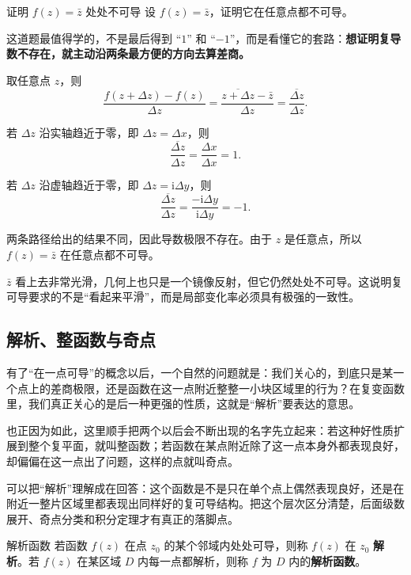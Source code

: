 \begin{lizi}{证明 $f(z)=\bar z$ 处处不可导}{}
设 $f(z)=\bar z$，证明它在任意点都不可导。

\begin{jie}
这道题最值得学的，不是最后得到 ``$1$'' 和 ``$-1$''，而是看懂它的套路：\textbf{想证明复导数不存在，就主动沿两条最方便的方向去算差商。}

取任意点 $z$，则
\[
    \frac{f(z+\Delta z)-f(z)}{\Delta z}
    =\frac{\overline{z+\Delta z}-\bar z}{\Delta z}
    =\frac{\overline{\Delta z}}{\Delta z}.
\]

若 $\Delta z$ 沿实轴趋近于零，即 $\Delta z=\Delta x$，则
\[
    \frac{\overline{\Delta z}}{\Delta z}
    =\frac{\Delta x}{\Delta x}=1.
\]

若 $\Delta z$ 沿虚轴趋近于零，即 $\Delta z=\mathrm{i}\Delta y$，则
\[
    \frac{\overline{\Delta z}}{\Delta z}
    =\frac{-\mathrm{i}\Delta y}{\mathrm{i}\Delta y}=-1.
\]

两条路径给出的结果不同，因此导数极限不存在。由于 $z$ 是任意点，所以 $f(z)=\bar z$ 在任意点都不可导。
\end{jie}
\end{lizi}

\begin{tishi}[这个反例为什么重要]
$\bar z$ 看上去非常光滑，几何上也只是一个镜像反射，但它仍然处处不可导。这说明复可导要求的不是``看起来平滑''，而是局部变化率必须具有极强的一致性。
\end{tishi}

\subsection{解析、整函数与奇点}

有了``在一点可导''的概念以后，一个自然的问题就是：我们关心的，到底只是某一个点上的差商极限，还是函数在这一点附近整整一小块区域里的行为？在复变函数里，我们真正关心的是后一种更强的性质，这就是``解析''要表达的意思。

也正因为如此，这里顺手把两个以后会不断出现的名字先立起来：若这种好性质扩展到整个复平面，就叫整函数；若函数在某点附近除了这一点本身外都表现良好，却偏偏在这一点出了问题，这样的点就叫奇点。

可以把``解析''理解成在回答：这个函数是不是只在单个点上偶然表现良好，还是在附近一整片区域里都表现出同样好的复可导结构。把这个层次区分清楚，后面级数展开、奇点分类和积分定理才有真正的落脚点。

\begin{dingliyi}{解析函数}{}
若函数 $f(z)$ 在点 $z_0$ 的某个邻域内处处可导，则称 $f(z)$ 在 $z_0$ \textbf{解析}。若 $f(z)$ 在某区域 $D$ 内每一点都解析，则称 $f$ 为 $D$ 内的\textbf{解析函数}。
\end{dingliyi}

